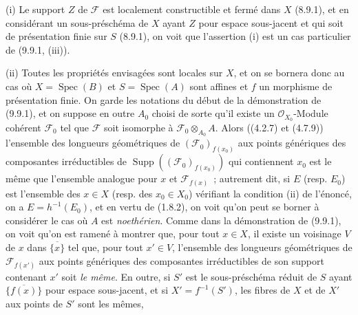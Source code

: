 (i) Le support $Z$ de $\mathcal F$ est localement constructible et fermé dans
$X$ (8.9.1), et en considérant un sous-préschéma de $X$ ayant $Z$ pour espace
sous-jacent et qui soit de présentation finie sur $S$ (8.9.1), on voit que
l'assertion (i) est un cas particulier de (9.9.1, (iii)).

(ii) Toutes les propriétés envisagées sont locales sur $X$, et on se bornera
donc au cas où $X=\operatorname{Spec}(B)$ et $S=\operatorname{Spec}(A)$ sont
affines et $f$ un morphisme de présentation finie. On garde les notations du
début de la démonstration de (9.9.1), et on suppose en outre $A_0$ choisi de
sorte qu'il existe un $\mathcal O_{X_0}$-Module cohérent $\mathcal F_0$ tel que
$\mathcal F$ soit isomorphe à $\mathcal F_0\otimes_{A_0}A$. Alors ((4.2.7) et
(4.7.9)) l'ensemble des longueurs géométriques de
$(\mathcal F_0)_{f(x_0)}$ aux points génériques des composantes irréductibles de
$\operatorname{Supp}((\mathcal F_0)_{f(x_0)})$ qui contiennent $x_0$ est le
même que l'ensemble analogue pour $x$ et $\mathcal F_{f(x)}$~; autrement dit,
si $E$ (resp. $E_0$) est l'ensemble des $x\in X$ (resp. des $x_0\in X_0$)
vérifiant la condition (ii) de l'énoncé, on a $E=h^{-1}(E_0)$, et en vertu de
(1.8.2), on voit qu'on peut se borner à considérer le cas où $A$ est
\emph{noethérien}. Comme dans la démonstration de (9.9.1), on voit qu'on est
ramené à montrer que, pour tout $x\in X$, il existe un voisinage $V$ de $x$
dans $\overline{\{x\}}$ tel que, pour tout $x'\in V$, l'ensemble des longueurs
géométriques de $\mathcal F_{f(x')}$ aux points génériques des composantes
irréductibles de son support contenant $x'$ soit \emph{le même}. En outre, si
$S'$ est le sous-préschéma réduit de $S$ ayant $\overline{\{f(x)\}}$ pour espace
sous-jacent, et si $X'=f^{-1}(S')$, les fibres de $X$ et de $X'$ aux points de
$S'$ sont les mêmes,

